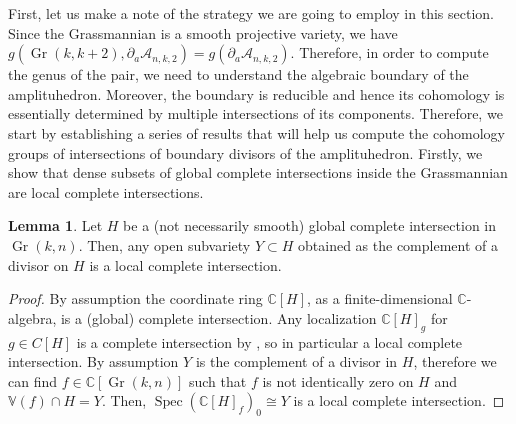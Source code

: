 \documentclass[12pt]{extarticle}
\theoremstyle{definition}
\theoremstyle{theorem}
\newtheorem{lemma}[definition]{Lemma}
\theoremstyle{remark}
\numberwithin{equation}{section}
\newcommand{\C}{\mathbb{C}}
\DeclareMathOperator{\gr}{Gr}
\newcommand{\aA}{\mathcal{A}}
\begin{document}
First, let us make a note of the strategy we are going to employ in this section.
Since the Grassmannian is a smooth projective variety, we have $g(\gr(k,k+2),\partial_a\aA_{n,k,2})=g(\partial_a\aA_{n,k,2})$.
Therefore, in order to compute the genus of the pair, we need to understand the algebraic boundary of the amplituhedron.
Moreover, the boundary is reducible and hence its cohomology is essentially determined by multiple intersections of its components.
Therefore, we start by establishing a series of results that will help us compute the cohomology groups of intersections of boundary divisors of the amplituhedron.
Firstly, we show that dense subsets of global complete intersections inside the Grassmannian are local complete intersections.
\begin{lemma}\label{lem:open_lci}
    Let $H$ be a (not necessarily smooth) global complete intersection in $\gr(k,n)$.
    Then, any open subvariety $Y\subset H$ obtained as the complement of a divisor on $H$ is a local complete intersection.
\end{lemma}
\begin{proof}
    By assumption the coordinate ring $\C[H]$, as a finite-dimensional $\C$-algebra, is a (global) complete intersection. Any localization $\C[H]_g$ for $g\in C[H]$ is a complete intersection by \cite[Lemma 10.135.2]{stacks-project_lci}, so in particular a local complete intersection.
    By assumption $Y$ is the complement of a divisor in $H$, therefore we can find $f\in \C[\gr(k,n)]$ such that $f$ is not identically zero on $H$ and $\mathbb{V}(f)\cap H=Y$.
    Then, $\operatorname{Spec}(\C[H]_f)_0\cong Y$ is a local complete intersection.
\end{proof}
\end{document}

